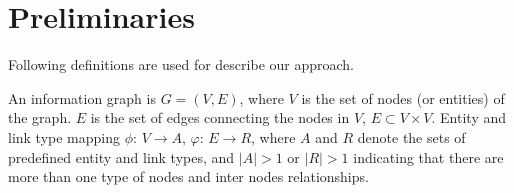 


\section{Preliminaries}\label{3PD}
Following definitions are used for describe our approach.

\begin{definition}
An information graph is $G = (V,E)$, where $V$ is the set of nodes (or entities) of the graph. $E$ is the set of edges connecting the nodes in $V$, $E \subset V \times V$.
Entity and link type mapping $\phi$: $V \rightarrow A$, $\varphi$: $E \rightarrow R$, where $A$ and $R$ denote the sets of predefined entity and link types, and $|A| > 1$ or $|R| > 1$ indicating that there are more than one type of nodes and inter nodes relationships.
\end{definition}

